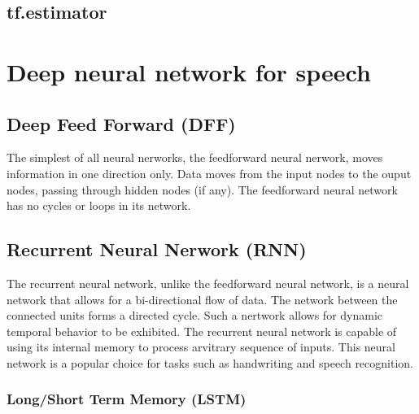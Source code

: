 \subsection{tf.estimator}


\section{Deep neural network for speech}

\subsection{Deep Feed Forward (DFF)}
The simplest of all neural nerworks, the feedforward neural nerwork, moves information in one direction only. Data moves from the input nodes to the ouput nodes, passing through hidden nodes (if any). The feedforward neural network has no cycles or loops in its network.

\subsection{Recurrent Neural Nerwork (RNN)}
The recurrent neural network, unlike the feedforward neural network, is a neural network that allows for a bi-directional flow of data. The network between the connected units forms a directed cycle. Such a nertwork allows for dynamic temporal behavior to be exhibited. The recurrent neural network is capable of using its internal memory to process arvitrary sequence of inputs. This neural network is a popular choice for tasks such as handwriting and speech recognition.

\subsubsection{Long/Short Term Memory (LSTM)}


